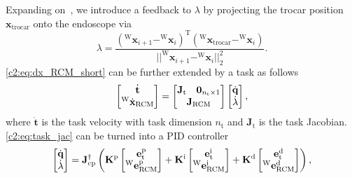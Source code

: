 Expanding on~\cite{aghakhani2013task}, we introduce a feedback to $\lambda$ by projecting the trocar position $\mathbf{x}_\text{trocar}$ onto the endoscope via
\begin{equation}
    \lambda = \frac{(^\text{W}\mathbf{x}_{i+1} - ^\text{W}\mathbf{x}_i)^\text{T}(^\text{W}\mathbf{x}_\text{trocar}-^\text{W}\mathbf{x}_i)}{||^\text{W}\mathbf{x}_{i+1}-^\text{W}\mathbf{x}_i||_2^2}.
\end{equation}
\eqref{c2:eq:dx_RCM_short} can be further extended by a task as follows
\begin{equation}
    \begin{bmatrix}\dot{\mathbf{t}} \\ ^\text{W}\dot{\mathbf{x}}_\text{RCM}\end{bmatrix} =
    \begin{bmatrix}\mathbf{J}_\text{t} & \mathbf{0}_{n_\text{t}\times 1} \\ \multicolumn{2}{c}{\mathbf{J}_\text{RCM}}
    \end{bmatrix}
    \begin{bmatrix}\dot{\mathbf{q}}\\\dot{\lambda}\end{bmatrix},
    \label{c2:eq:task_jac}
\end{equation}
where $\dot{\mathbf{t}}$ is the task velocity with task dimension $n_\text{t}$ and $\mathbf{J}_\text{t}$ is the task Jacobian. \eqref{c2:eq:task_jac} can be turned into a PID controller
\begin{equation}
    \centering
    \begin{bmatrix}
        \dot{\mathbf{q}}\\
        \dot{\lambda}
    \end{bmatrix} = 
    \mathbf{J}_\text{cp}^{\dagger}
    \left(
        \mathbf{K}^\text{p}
        \begin{bmatrix}
            \mathbf{e}_\text{t}^\text{p}\\
            ^\text{W}\mathbf{e}_\text{RCM}^\text{p}
        \end{bmatrix} +
        \mathbf{K}^\text{i}
        \begin{bmatrix}
            \mathbf{e}_\text{t}^\text{i}\\
            ^\text{W}\mathbf{e}_\text{RCM}^\text{i}
        \end{bmatrix} +
        \mathbf{K}^\text{d}
        \begin{bmatrix}
            \mathbf{e}_\text{t}^\text{d}\\
            ^\text{W}\mathbf{e}_\text{RCM}^\text{d}
        \end{bmatrix}
    \right),
    \label{c2:eq:pid}
\end{equation}
